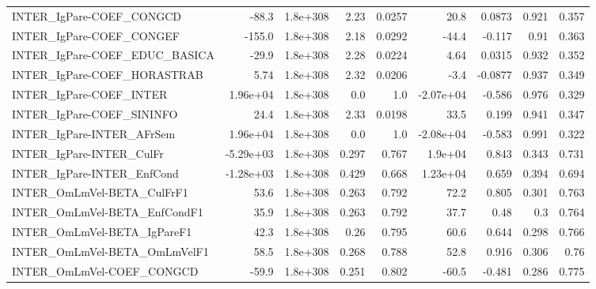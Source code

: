 \begin{tabular}{lrrrrrrrr}
INTER\_IgPare-COEF\_CONGCD              &       -88.3 &     1.8e+308 &    2.23 &   0.0257 &       20.8 &      0.0873 &        0.921 &         0.357 \\
INTER\_IgPare-COEF\_CONGEF              &      -155.0 &     1.8e+308 &    2.18 &   0.0292 &      -44.4 &      -0.117 &         0.91 &         0.363 \\
INTER\_IgPare-COEF\_EDUC\_BASICA         &       -29.9 &     1.8e+308 &    2.28 &   0.0224 &       4.64 &      0.0315 &        0.932 &         0.352 \\
INTER\_IgPare-COEF\_HORASTRAB           &        5.74 &     1.8e+308 &    2.32 &   0.0206 &       -3.4 &     -0.0877 &        0.937 &         0.349 \\
INTER\_IgPare-COEF\_INTER               &    1.96e+04 &     1.8e+308 &     0.0 &      1.0 &  -2.07e+04 &      -0.586 &        0.976 &         0.329 \\
INTER\_IgPare-COEF\_SININFO             &        24.4 &     1.8e+308 &    2.33 &   0.0198 &       33.5 &       0.199 &        0.941 &         0.347 \\
INTER\_IgPare-INTER\_AFrSem             &    1.96e+04 &     1.8e+308 &     0.0 &      1.0 &  -2.08e+04 &      -0.583 &        0.991 &         0.322 \\
INTER\_IgPare-INTER\_CulFr              &   -5.29e+03 &     1.8e+308 &   0.297 &    0.767 &    1.9e+04 &       0.843 &        0.343 &         0.731 \\
INTER\_IgPare-INTER\_EnfCond            &   -1.28e+03 &     1.8e+308 &   0.429 &    0.668 &   1.23e+04 &       0.659 &        0.394 &         0.694 \\
INTER\_OmLmVel-BETA\_CulFrF1            &        53.6 &     1.8e+308 &   0.263 &    0.792 &       72.2 &       0.805 &        0.301 &         0.763 \\
INTER\_OmLmVel-BETA\_EnfCondF1          &        35.9 &     1.8e+308 &   0.263 &    0.792 &       37.7 &        0.48 &          0.3 &         0.764 \\
INTER\_OmLmVel-BETA\_IgPareF1           &        42.3 &     1.8e+308 &    0.26 &    0.795 &       60.6 &       0.644 &        0.298 &         0.766 \\
INTER\_OmLmVel-BETA\_OmLmVelF1          &        58.5 &     1.8e+308 &   0.268 &    0.788 &       52.8 &       0.916 &        0.306 &          0.76 \\
INTER\_OmLmVel-COEF\_CONGCD             &       -59.9 &     1.8e+308 &   0.251 &    0.802 &      -60.5 &      -0.481 &        0.286 &         0.775 \\

\end{tabular}
